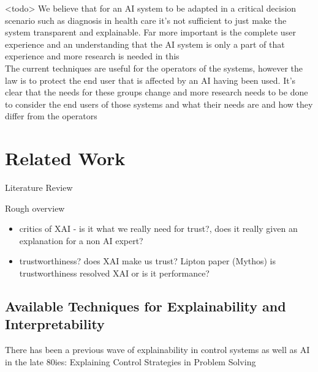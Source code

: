 \documentclass[manuscript,screen,review]{acmart}
\begin{document}
<todo> We believe that for an AI system to be adapted in a critical decision scenario such as diagnosis in health care it’s not sufficient to just make the system transparent and explainable. Far more important is the complete user experience and an understanding that the AI system is only a part of that experience and more research is needed in this\\
The current techniques are useful for the operators of the systems, however the law is to protect the end user that is affected by an AI having been used. It’s clear that the needs for these groups change and more research needs to be done to consider the end users of those systems and what their needs are and how they differ from the operators\\


\section{Related Work}
Literature Review

Rough overview
\begin{itemize}
    \item critics of XAI - is it what we really need for trust?, does it really given an explanation for a non AI expert? 
    \item trustworthiness? does XAI make us trust? Lipton paper (Mythos) is trustworthiness resolved XAI or is it performance?
\end{itemize}

\subsection{Available Techniques for Explainability and Interpretability}
There has been a previous wave of explainability in control systems as well as AI in the late 80ies: Explaining Control Strategies in Problem Solving\cite{Chandrasekaran1989}
\end{document}
